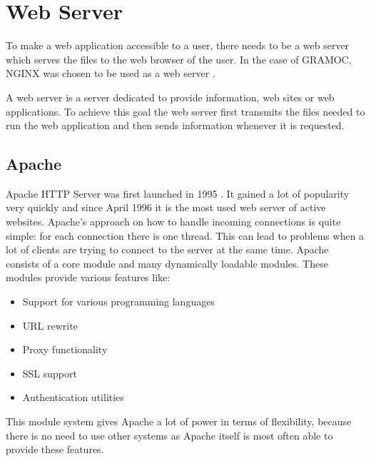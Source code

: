 \chapter{Web Server}
\label{sec:webserver}

\author{Nico Leidenfrost}
%
To make a web application accessible to a user, there needs to be a web server which serves the files to the web browser of the user. In the case of GRAMOC, NGINX was chosen to be used as a web server \autocite{nginx}.

A web server is a server dedicated to provide information, web sites or web applications. To achieve this goal the web server first transmits the files needed to run the web application and then sends information whenever it is requested.

\section{Apache}
Apache HTTP Server was first launched in 1995 \autocite{apache}. It gained a lot of popularity very quickly and since April 1996 it is the most used web server of active websites. Apache's approach on how to handle incoming connections is quite simple: for each connection there is one thread. This can lead to problems when a lot of clients are trying to connect to the server at the same time. Apache consists of a core module and many dynamically loadable modules. These modules provide various features like:

\begin{itemize}
    \item Support for various programming languages
    \item URL rewrite
    \item Proxy functionality
    \item SSL support
    \item Authentication utilities
\end{itemize}

This module system gives Apache a lot of power in terms of flexibility, because there is no need to use other systems as Apache itself is most often able to provide these features.

